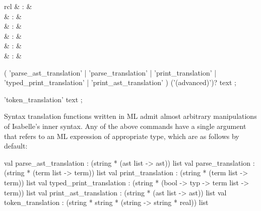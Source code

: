 \begin{isabellebody}
\begin{isamarkuptext}
\begin{descr}
  \end{descr}%
\end{isamarkuptext}%
\isamarkuptrue%
%
\isamarkuptrue%
%
\begin{isamarkuptext}%
\begin{matharray}{rcl}
     & : &  \\
     & : &  \\
     & : &  \\
     & : &  \\
     & : &  \\
     & : &  \\
  \end{matharray}

  \begin{rail}
  ( 'parse\_ast\_translation' | 'parse\_translation' | 'print\_translation' |
    'typed\_print\_translation' | 'print\_ast\_translation' ) ('(advanced)')? text
  ;

  'token\_translation' text
  ;
  \end{rail}

  Syntax translation functions written in ML admit almost arbitrary
  manipulations of Isabelle's inner syntax.  Any of the above commands
  have a single  argument that refers to an ML
  expression of appropriate type, which are as follows by default:

\begin{ttbox}
val parse_ast_translation   : (string * (ast list -> ast)) list
val parse_translation       : (string * (term list -> term)) list
val print_translation       : (string * (term list -> term)) list
val typed_print_translation :
  (string * (bool -> typ -> term list -> term)) list
val print_ast_translation   : (string * (ast list -> ast)) list
val token_translation       :
  (string * string * (string -> string * real)) list
\end{ttbox}


\end{isamarkuptext}
\end{isabellebody}
